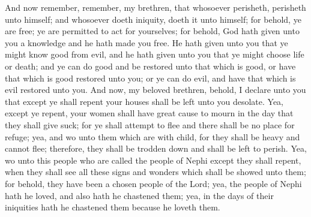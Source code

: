 And now remember, remember, my brethren, that whosoever perisheth, perisheth unto himself; and whosoever doeth iniquity, doeth it unto himself; for behold, ye are free; ye are permitted to act for yourselves; for behold, God hath given unto you a knowledge and he hath made you free.
\bverse \iffalse He hath given unto you that ye might know good from evil, and he hath given unto you that ye might choose life or death; and ye can do good and be restored unto that which is good, or have that which is good restored unto you; or ye can do evil, and have that which is evil restored unto you. \fi
He hath given unto you that ye might know good from evil, and he hath given unto you that ye might choose life or death; and ye can do good and be restored unto that which is good, or have that which is good restored unto you; or ye can do evil, and have that which is evil restored unto you.
\bchapter
\bverse \iffalse And now, my beloved brethren, behold, I declare unto you that except ye shall repent your houses shall be left unto you desolate. \fi
And now, my beloved brethren, behold, I declare unto you that except ye shall repent your houses shall be left unto you desolate.
\bverse \iffalse Yea, except ye repent, your women shall have great cause to mourn in the day that they shall give suck; for ye shall attempt to flee and there shall be no place for refuge; yea, and wo unto them which are with child, for they shall be heavy and cannot flee; therefore, they shall be trodden down and shall be left to perish. \fi
Yea, except ye repent, your women shall have great cause to mourn in the day that they shall give suck; for ye shall attempt to flee and there shall be no place for refuge; yea, and wo unto them which are with child, for they shall be heavy and cannot flee; therefore, they shall be trodden down and shall be left to perish.
\bverse \iffalse Yea, wo unto this people who are called the people of Nephi except they shall repent, when they shall see all these signs and wonders which shall be showed unto them; for behold, they have been a chosen people of the Lord; yea, the people of Nephi hath he loved, and also hath he chastened them; yea, in the days of their iniquities hath he chastened them because he loveth them. \fi
Yea, wo unto this people who are called the people of Nephi except they shall repent, when they shall see all these signs and wonders which shall be showed unto them; for behold, they have been a chosen people of the Lord; yea, the people of Nephi hath he loved, and also hath he chastened them; yea, in the days of their iniquities hath he chastened them because he loveth them.
